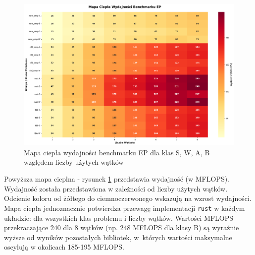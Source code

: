 \begin{figure}[H]
    \centering
    \includegraphics[width=\textwidth]{analiza/images/parallel/ep/arm/ep_mapa_ciepla_wydajnosci.png}
    \caption{Mapa ciepła wydajności benchmarku EP dla klas S, W, A, B względem liczby użytych wątków}
    \label{ep_heatmap_wydajnosci}
\end{figure}
Powyższa mapa cieplna - rysunek \ref{ep_heatmap_wydajnosci} przedstawia wydajność (w MFLOPS). Wydajność została przedstawiona w zależności od liczby użytych wątków. Odcienie koloru od żółtego do ciemnoczerwonego wskazują na wzrost wydajności.\\
Mapa ciepła jednoznacznie potwierdza przewagę implementacji \texttt{rust} w każdym układzie: dla wszystkich klas problemu i liczby wątków. Wartości MFLOPS przekraczające 240 dla 8 wątków (np. 248 MFLOPS dla klasy B) są wyraźnie wyższe od wyników pozostałych bibliotek, w~których wartości maksymalne oscylują w okolicach 185-195 MFLOPS.



